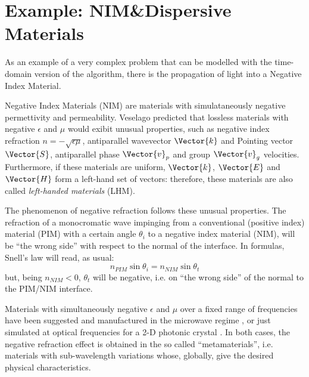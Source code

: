 
\section{Example: NIM\&Dispersive Materials} \label{sec:nim}

As an example of a very complex problem that can be modelled with the
time-domain version of the algorithm, there is the propagation of
light into a Negative Index Material.


Negative Index Materials (NIM) are materials with simulataneously
negative permettivity and permeability. Veselago
\cite{veselago_electrodynamics} predicted that lossless materials with
negative $\epsilon$ and $\mu$ would exibit unusual properties, such as
negative index refraction $n = -\sqrt{\epsilon \mu}$, antiparallel
wavevector $\Vector{k}$ and Pointing vector $\Vector{S}$, antiparallel
phase $\Vector{v}_p$ and group $\Vector{v}_g$ velocities. Furthermore,
if these materials are uniform, $\Vector{k}$, $\Vector{E}$ and
$\Vector{H}$ form a left-hand set of vectors: therefore, these
materials are also called \emph{left-handed materials} (LHM).

The phenomenon of negative refraction follows these unusual
properties. The refraction of a monocromatic wave impinging from a
conventional (positive index) material (PIM) with a certain angle $\theta_i$
to a negative index material (NIM), will be ``the wrong side'' with respect
to the normal of the interface. In formulas, Snell's law will read, as
usual:
\begin{equation*}
  n_{PIM} \sin{\theta_i} = n_{NIM} \sin{\theta_t}
\end{equation*}
but, being $n_{NIM} < 0$, $\theta_t$ will be negative, i.e. on ``the
wrong side'' of the normal to the PIM/NIM interface.

Materials with simultaneously negative $\epsilon$ and $\mu$ over a
fixed range of frequencies have been suggested \cite{pendry1}
\cite{pendry2} and manufactured in the microwave
regime \cite{smith1}, or just simulated at optical
frequencies for a 2-D photonic crystal
\cite{foteinopoulou_refraction}. In both cases, the negative
refraction effect is obtained in the so called ``metamaterials'',
i.e. materials with sub-wavelength variations whose, globally, give
the desired physical characteristics.


